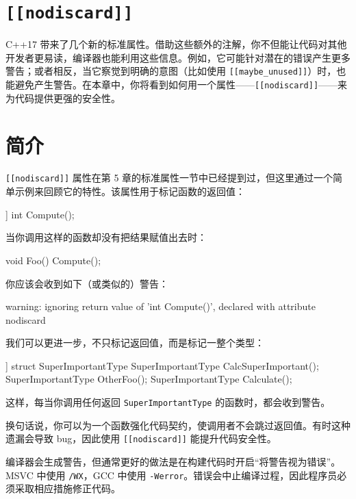 \section{\texttt{\texttt{[[nodiscard]]}}}

C++17 带来了几个新的标准属性。借助这些额外的注解，你不但能让代码对其他开发者更易读，编译器也能利用这些信息。例如，它可能针对潜在的错误产生更多警告；或者相反，当它察觉到明确的意图（比如使用 \texttt{\texttt{[[maybe\_unused]]}}）时，也能避免产生警告。在本章中，你将看到如何用一个属性——\texttt{\texttt{[[nodiscard]]}}——来为代码提供更强的安全性。

\section{简介}

\texttt{\texttt{[[nodiscard]]}} 属性在第 5 章的标准属性一节中已经提到过，但这里通过一个简单示例来回顾它的特性。该属性用于标记函数的返回值：

\begin{codebox}[cpp]
[[nodiscard]] int Compute();
\end{codebox}

当你调用这样的函数却没有把结果赋值出去时：

\begin{codebox}[cpp]
void Foo() {
Compute();
}
\end{codebox}

你应该会收到如下（或类似的）警告：

\begin{codebox}
warning: ignoring return value of 'int Compute()',
declared with attribute nodiscard
\end{codebox}

我们可以更进一步，不只标记返回值，而是标记一整个类型：

\begin{codebox}[cpp]
[[nodiscard]] struct SuperImportantType { }
SuperImportantType CalcSuperImportant();
SuperImportantType OtherFoo();
SuperImportantType Calculate();
\end{codebox}

这样，每当你调用任何返回 \texttt{SuperImportantType} 的函数时，都会收到警告。

换句话说，你可以为一个函数强化代码契约，使调用者不会跳过返回值。有时这种遗漏会导致 bug，因此使用 \texttt{\texttt{[[nodiscard]]}} 能提升代码安全性。

编译器会生成警告，但通常更好的做法是在构建代码时开启“将警告视为错误”。MSVC 中使用 \texttt{/WX}，GCC 中使用 \texttt{-Werror}。错误会中止编译过程，因此程序员必须采取相应措施修正代码。

